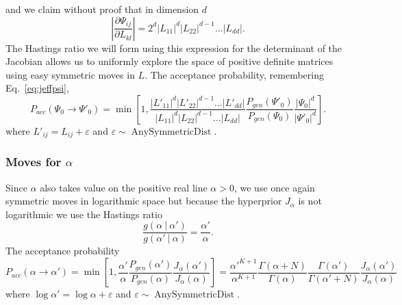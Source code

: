 \documentclass[11pt, oneside]{article}   	%
\begin{document}
and we claim without proof that in dimension $d$
$$\left\vert\frac{\partial\Psi_{ij}}{\partial L_{kl}}\right\vert = 2^d \vert L_{11}\vert^d \vert L_{22}\vert^{d-1}\ldots \vert L_{dd}\vert.$$
The Hastings ratio we will form using this expression for the determinant of the Jacobian allows us to uniformly explore the space of positive definite matrices using easy symmetric moves in $L$. The acceptance probability, remembering Eq.~\ref{eq:jeffpsi},
$$P_{acc}(\Psi_0\rightarrow\Psi'_0) = \min\left[1, \frac{\vert L'_{11}\vert^d \vert L'_{22}\vert^{d-1}\ldots \vert L'_{dd}\vert}{\vert L_{11}\vert^d \vert L_{22}\vert^{d-1}\ldots \vert L_{dd}\vert}\frac{P_{gen}(\Psi'_0)}{P_{gen}(\Psi_0)}\frac{\vert\Psi_0\vert^d}{\vert\Psi'_0\vert^d}\right].$$
where $L'_{ij} = L_{ij} + \varepsilon$ and $\varepsilon\sim\operatorname{AnySymmetricDist}$.

\subsubsection{Moves for $\alpha$}
Since $\alpha$ also takes value on the positive real line $\alpha > 0$, we use once again symmetric moves in logarithmic space but because the hyperprior $J_\alpha$ is not logarithmic we use the Hastings ratio
$$\frac{g(\alpha~\vert~\alpha')}{g(\alpha'~\vert~\alpha)} = \frac{\alpha'}{\alpha}.$$
The acceptance probability
$$P_{acc}(\alpha\rightarrow\alpha') = \min\left[1, \frac{\alpha'}{\alpha}\frac{P_{gen}(\alpha')}{P_{gen}(\alpha)}\frac{J_{\alpha}(\alpha')}{J_\alpha(\alpha)}\right] = \frac{\alpha'^{K+1}}{\alpha^{K+1}}\frac{\Gamma(\alpha + N)}{\Gamma(\alpha)}\frac{\Gamma(\alpha')}{\Gamma(\alpha' + N)}\frac{J_\alpha(\alpha')}{J_\alpha(\alpha)}$$
where $\log\alpha' = \log\alpha + \varepsilon$ and $\varepsilon\sim\operatorname{AnySymmetricDist}$.
\end{document}
